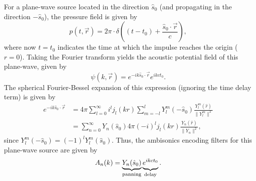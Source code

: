 For a plane-wave source located in the direction $\hat{s}_0$ (and propagating in the direction $-\hat{s}_0$), the pressure field is given by
\begin{equation}
p(t,\vec{r}) = 2 \pi \cdot \delta \left( (t-t_0) + \frac{\hat{s}_0 \cdot \vec{r}}{c} \right),
\end{equation}
where now $t = t_0$ indicates the time at which the impulse reaches the origin ($r = 0$).
Taking the Fourier transform yields the acoustic potential field of this plane-wave, given by \citep[Eq.~(2.24), with $\vec{k} = -k\hat{s}_0$]{Williams1999}
\begin{equation}
\psi(k,\vec{r}) = e^{-i k \hat{s}_0 \cdot \vec{r}} e^{i k c t_0}.
\end{equation} %
The spherical Fourier-Bessel expansion of this expression (ignoring the time delay term) is given by~\citep[Eq.~(6.175)]{Williams1999}
\begin{align}
e^{-i k \hat{s}_0 \cdot \vec{r}} &= 4 \pi \sum_{l=0}^{\infty} i^l j_l(k r) \sum_{m=-l}^{l} Y_l^m (-\hat{s}_0) \frac{Y_l^m (\hat{r})}{\|Y_l^m\|^2}\\
	&= \sum_{n=0}^{\infty} Y_n (\hat{s}_0) 4 \pi (-i)^l j_l(k r) \frac{Y_n (\hat{r})}{\|Y_n\|^2} ,
\end{align} %
since $Y_l^m (-\hat{s}_0) = (-1)^l Y_l^m (\hat{s}_0)$.
Thus, the ambisonics encoding filters for this plane-wave source are given by
\begin{equation}\label{eq:02_Acoustical_Theory:PlaneSource_An}
A_n(k) = \underbrace{Y_n (\hat{s}_0)}_{\text{panning}} \underbrace{ \vphantom{ Y_n (\hat{s}_0) } e^{i k c t_0}}_{\text{delay}}.
\end{equation}

